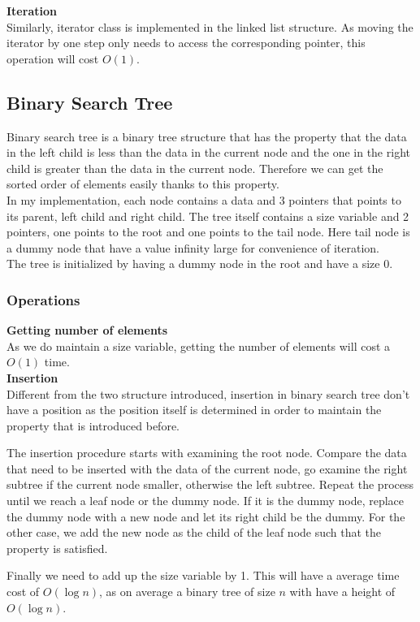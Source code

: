 \documentclass{article}
\begin{document}
	\noindent\textbf{Iteration}\\
	Similarly, iterator class is implemented in the linked list structure. As moving the iterator by one step only needs to access the corresponding pointer, this operation will cost $O(1)$.

	\subsection{Binary Search Tree}
	Binary search tree is a binary tree structure that has the property that the data in the left child is less than the data in the current node and the one in the right child is greater than the data in the current node. Therefore we can get the sorted order of elements easily thanks to this property. \\
	In my implementation, each node contains a data and 3 pointers that points to its parent, left child and right child. The tree itself contains a size variable and 2 pointers, one points to the root and one points to the tail node. Here tail node is a dummy node that have a value infinity large for convenience of iteration. \\ 
	The tree is initialized by having a dummy node in the root and have a size 0.
	\subsubsection{Operations}	
	\textbf{Getting number of elements}\\
		As we do maintain a size variable, getting the number of elements will cost a $O(1)$ time.\\
		
	\noindent\textbf{Insertion}\\
		Different from the two structure introduced, insertion in binary search tree don't have a position as the position itself is determined in order to maintain the property that is introduced before. 
		
		The insertion procedure starts with examining the root node. Compare the data that need to be inserted with the data of the current node, go examine the right subtree if the current node smaller, otherwise the left subtree. 
		Repeat the process until we reach a leaf node or the dummy node. If it is the dummy node, replace the dummy node with a new node and let its right child be the dummy. For the other case, we add the new node as the child of the leaf node such that the property is satisfied. 
		
		Finally we need to add up the size variable by 1. This will have a average time cost of $O(\log n)$, as on average a binary tree of size $n$ with have a height of $O(\log n)$. 
		
\end{document}
